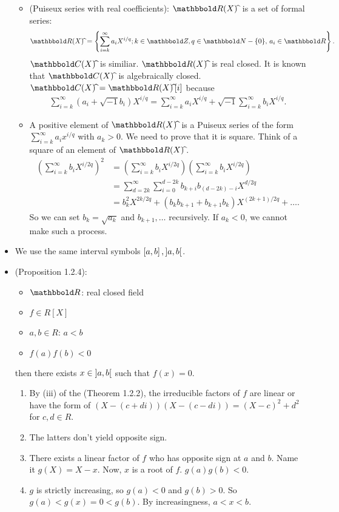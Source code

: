\documentclass[9pt]{ltjsarticle}
\begin{document}
\begin{itemize}
\begin{itemize}
    \item
    (Puiseux series with real coefficients):
    $\R (X)\puiseux$ is a set of formal series:
    \begin{align}
      \R (X)\puiseux
      =
      \set{\sum_{i=k}^\infty a_i X^{i/q}; k\in \Z, q\in \N-\zeroset,\, a_i \in \R}.
    \end{align}
    $\C (X)\puiseux$ is similiar.
    $\R (X)\puiseux$ is real closed.
    \pf
    It is known that $\C (X)\puiseux$ is algebraically closed.
    $\C (X)\puiseux = \R (X)\puiseux [i]$ because
    \begin{align}
      \sum_{i=k}^\infty (a_i + \sqrt{-1}b_i)X^{i/q}
      =
      \sum_{i=k}^\infty a_i X^{i/q} + \sqrt{-1}\sum_{i=k}^\infty b_i X^{i/q}.
    \end{align}
    \item
    A positive element of $\R (X)\puiseux$ is a Puiseux
    series of the form $\sum_{i=k}^\infty a_i x^{i/q}$ with $a_k>0$.
    \pf
    We need to prove that it is square.
    Think of a square of an element of $\R (X)\puiseux$.
    \begin{align}
      (\sum_{i=k}^\infty b_i X^{i/2q})^2
      &=
      (\sum_{i=k}^\infty b_i X^{i/2q})(\sum_{i=k}^\infty b_i X^{i/2q})\\
      &=
      \sum_{d=2k}^\infty \sum_{i=0}^{d-2k} b_{k+i} b_{(d-2k)-i} X^{d/2q}\\
      &=
      b_k^2 X^{2k/2q} + (b_k b_{k+1} + b_{k+1}b_k)X^{(2k+1)/2q} + \dots.
    \end{align}
    So we can set $b_k = \sqrt{a_k}$ and $b_{k+1},\dots$ recursively.
    If $a_k < 0$, we cannot make such a process.
  \end{itemize}
  \item
  We use the same interval symbols $\left[ a,b \right],\left] a,b \right[$.
  \item
  (Proposition 1.2.4):
  \begin{itemize}
    \item $\R$: real closed field
    \item$f\in R [X]$
    \item $a,b \in R$: $a<b$
    \item $f(a)f(b) < 0$
  \end{itemize}
  then there exists $x \in \left] a,b \right[$ such that $f(x )=0$.

  \pf
  \begin{enumerate}
    \item By (iii) of the (Theorem 1.2.2), the irreducible factors of $f$ are linear or
    have the form of $(X-(c+di))(X-(c-di))=(X-c)^2 + d^2$ for $c,d\in R$.
    \item
    The latters don't yield opposite sign.
    \item
    There exists a linear factor of $f$ who has opposite sign at $a$ and $b$.
    Name it $g(X)= X-x$.  Now, $x$ is a root of $f$.
    $g(a)g(b) < 0$.
    \item
    $g$ is strictly increasing, so $g(a) < 0$ and $g(b) > 0$.
    So $g(a) < g(x) = 0 < g(b)$.
    By increasingness, $a<x<b$.


\end{enumerate}
\end{itemize}
\end{document}
